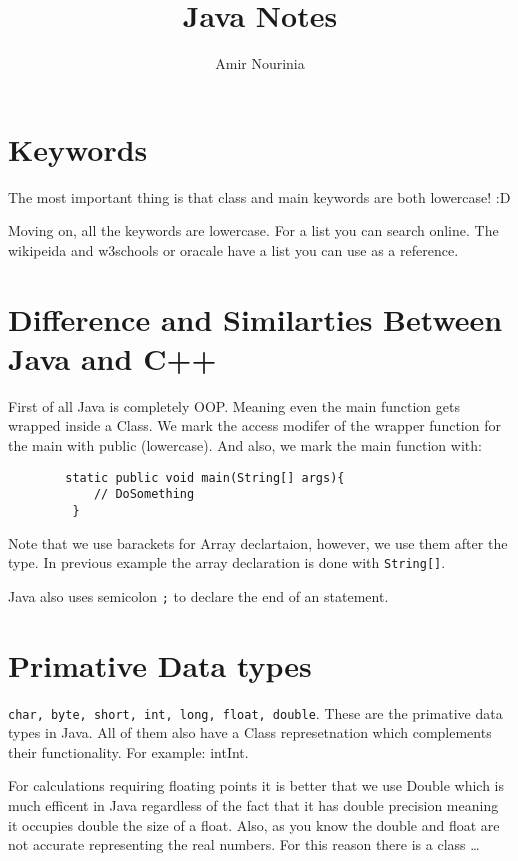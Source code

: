 \documentclass[11pt,twoside,a4paper]{report}
\title{Java Notes}
\author{Amir Nourinia}
\begin{document}
    \maketitle
    \tableofcontents
    \section{Keywords}
    The most important thing is that class and main keywords are both lowercase! :D

    Moving on, all the keywords are lowercase. For a list you can search online. The wikipeida and w3schools or oracale have a list you can use as a reference.
    \section{Difference and Similarties Between Java and C++}
        First of all Java is completely OOP. Meaning even the main function gets wrapped inside a Class.
        We mark the access modifer of the wrapper function for the main with public (lowercase). And also, we mark
        the main function with:
        
        \begin{lstlisting}
        static public void main(String[] args){
            // DoSomething
         }
        \end{lstlisting}

        Note that we use barackets for Array declartaion, however, we use them after the type. In previous example the array declaration is done 
        with \verb|String[]|.

        Java also uses semicolon \verb|;| to declare the end of an statement.

    \section{Primative Data types}
        \verb|char, byte, short, int, long, float, double|. These are the primative data types in Java. All of them also have a Class represetnation
        which complements their functionality. For example: int\textrightarrow Int.

        For calculations requiring floating points it is better that we use Double which is much efficent in Java regardless of the fact that it has double precision meaning it occupies double the size
        of a float. Also, as you know the double and float are not accurate representing the real numbers. For this reason there is a class \dots
\end{document}
